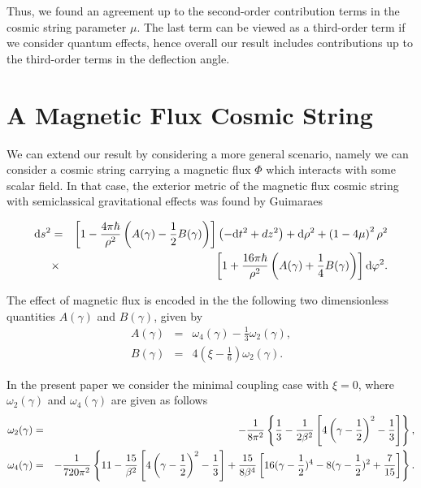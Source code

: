\documentclass[preprint,superscriptaddress,amsfonts,amssymb,amsmath,showpacs]{revtex4}
\begin{document}
Thus, we found an agreement up to the second-order contribution terms in the cosmic string parameter $\mu$. The last term can be viewed as a third-order term if we consider quantum effects, hence overall our result includes contributions up to the third-order terms in the deflection angle. 

\section{A Magnetic Flux Cosmic String} 

We can extend our result by considering a more general scenario, namely we can consider a cosmic string carrying a magnetic flux $\Phi$ which interacts with some scalar field. In that case, the exterior metric of the magnetic flux cosmic
string with semiclassical gravitational effects was found by Guimaraes \cite{guimares}

\begin{eqnarray}\notag
\mathrm{d}s^2 &=& \left[1-\frac{4 \pi  \hbar }{\rho^2}\left(A(\gamma)-\frac{1}{2}B(\gamma) \right)\right]\left(-\mathrm{d}t^2+dz^2\right)+\mathrm{d}\rho^2+\left(1-4\mu\right)^2 \rho^2 \\
& \times & \left[1+\frac{16 \pi \hbar}{\rho^2} \left(A(\gamma)+\frac{1}{4}B(\gamma) \right)\right]\mathrm{d}\varphi^2.
\end{eqnarray}

The effect of magnetic flux is encoded in the the following two dimensionless quantities
$A (\gamma)$ and $B (\gamma)$, given by \cite{guimares}
\begin{eqnarray}
A (\gamma) &=& \omega_4 (\gamma)-\frac{1}{3}\omega_2 (\gamma) ,\\
B (\gamma) &=& 4 \left(\xi-\frac{1}{6}\right) \omega_2(\gamma).
\end{eqnarray}

In the present paper we consider the minimal  coupling case with $\xi=0$, where $\omega_2(\gamma)$ and $\omega_4(\gamma)$ are given as follows
\begin{eqnarray}\notag
\omega_2(\gamma) &=& - \frac{1}{8 \pi^2}\left\lbrace \frac{1}{3}-\frac{1}{2 \beta^2}\left[4 \left(  \gamma-\frac{1}{2}\right)^2-\frac{1}{3}    \right]    \right\rbrace ,\\\notag
\omega_4 (\gamma) &=& - \frac{1}{720 \pi^2}\left\lbrace 11-\frac{15}{\beta^2}\left[4 \left(\gamma-\frac{1}{2}    \right)^2-\frac{1}{3}      \right]+\frac{15}{8 \beta^4}\left[ 16 (\gamma-\frac{1}{2})^4-8(\gamma-\frac{1}{2})^2+\frac{7}{15}  \right]  \right\rbrace .
\end{eqnarray}
\end{document}
